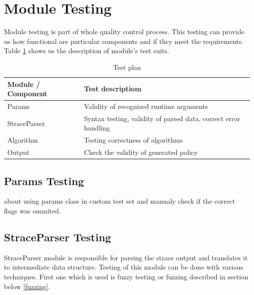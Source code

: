 \section{Module Testing}
Module testing is part of whole quality control process.
This testing can provide us how functional are particular components and if they meet the requirements.
Table \ref{table:moduletesting} shows us the description of module's test suits.

\begin{table}[h]
	\centering
	\begin{tabular}{|l|p{10cm}|}
		\hline
		\textbf{Module / Component}	&	\textbf{Test descriptiom} \\ \hline \hline
		Params 											& Validity of recognized runtime arguments \\ \hline
		StraceParser								& Syntax testing, validity of parsed data, correct error handling \\ \hline
		Algorithm 									& Testing correctness of algorithms \\ \hline
		Output                      & Check the validity of generated policy \\ \hline
	\end{tabular}
	\caption{Test plan}
	\label{table:moduletesting}
\end{table}

\subsection{Params Testing}
about using params class in custom test set and manualy check if the correct flags was ommited.

\subsection{StraceParser Testing}
StraceParser module is responsible for parsing the strace output and translates it to intermediate data structure.
Testing of this module can be done with various techniques.
First one which is used is fuzzy testing or fuzzing described in section below \ref{fuzzing}.

